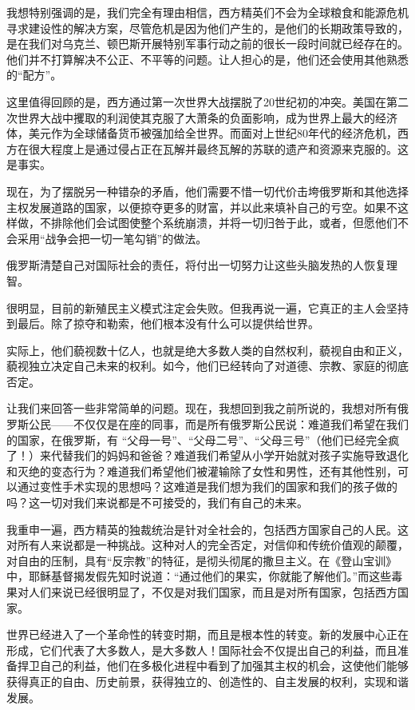 \documentclass[UTF8, 11pt, oneside]{ctexart}
\begin{document}
我想特别强调的是，我们完全有理由相信，西方精英们不会为全球粮食和能源危机寻求建设性的解决方案，尽管危机是因为他们产生的，是他们的长期政策导致的，是在我们对乌克兰、顿巴斯开展特别军事行动之前的很长一段时间就已经存在的。他们并不打算解决不公正、不平等的问题。让人担心的是，他们还会使用其他熟悉的“配方”。

这里值得回顾的是，西方通过第一次世界大战摆脱了20世纪初的冲突。美国在第二次世界大战中攫取的利润使其克服了大萧条的负面影响，成为世界上最大的经济体，美元作为全球储备货币被强加给全世界。而面对上世纪80年代的经济危机，西方在很大程度上是通过侵占正在瓦解并最终瓦解的苏联的遗产和资源来克服的。这是事实。

现在，为了摆脱另一种错杂的矛盾，他们需要不惜一切代价击垮俄罗斯和其他选择主权发展道路的国家，以便掠夺更多的财富，并以此来填补自己的亏空。如果不这样做，不排除他们会试图使整个系统崩溃，并将一切归咎于此，或者，但愿他们不会采用“战争会把一切一笔勾销”的做法。

俄罗斯清楚自己对国际社会的责任，将付出一切努力让这些头脑发热的人恢复理智。

很明显，目前的新殖民主义模式注定会失败。但我再说一遍，它真正的主人会坚持到最后。除了掠夺和勒索，他们根本没有什么可以提供给世界。

实际上，他们藐视数十亿人，也就是绝大多数人类的自然权利，藐视自由和正义，藐视独立决定自己未来的权利。如今，他们已经转向了对道德、宗教、家庭的彻底否定。

让我们来回答一些非常简单的问题。现在，我想回到我之前所说的，我想对所有俄罗斯公民——不仅仅是在座的同事，而是所有俄罗斯公民说：难道我们希望在我们的国家，在俄罗斯，有 “父母一号”、“父母二号”、“父母三号”（他们已经完全疯了！）来代替我们的妈妈和爸爸？难道我们希望从小学开始就对孩子实施导致退化和灭绝的变态行为？难道我们希望他们被灌输除了女性和男性，还有其他性别，可以通过变性手术实现的思想吗？这难道是我们想为我们的国家和我们的孩子做的吗？这一切对我们来说都是不可接受的，我们有自己的未来。

我重申一遍，西方精英的独裁统治是针对全社会的，包括西方国家自己的人民。这对所有人来说都是一种挑战。这种对人的完全否定，对信仰和传统价值观的颠覆，对自由的压制，具有“反宗教”的特征，是彻头彻尾的撒旦主义。在《登山宝训》中，耶稣基督揭发假先知时说道：“通过他们的果实，你就能了解他们。”而这些毒果对人们来说已经很明显了，不仅是对我们国家，而且是对所有国家，包括西方国家。

世界已经进入了一个革命性的转变时期，而且是根本性的转变。新的发展中心正在形成，它们代表了大多数人，是大多数人！国际社会不仅提出自己的利益，而且准备捍卫自己的利益，他们在多极化进程中看到了加强其主权的机会，这使他们能够获得真正的自由、历史前景，获得独立的、创造性的、自主发展的权利，实现和谐发展。
\end{document}
